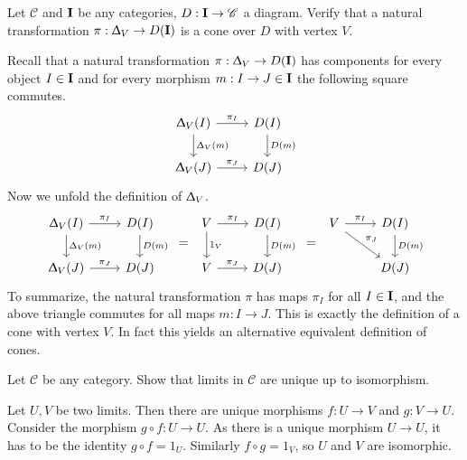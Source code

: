 \begin{exercise}
  Let $\mathscr{C}$ and $\bf{I}$ be any categories, $D : \bf{I} \to \mathscr{C}$ a diagram.
  Verify that a natural transformation $\pi : \Updelta_V \to D(\bf{I})$ is a cone over $D$ with vertex $V$.
\end{exercise}
\begin{answer}
  Recall that a natural transformation $\pi : \Updelta_V \to D(\bf{I})$ has components for every object $I \in \bf{I}$
  and for every morphism $m : I \to J \in \bf{I}$ the following square commutes.
  \[
    \begin{tikzcd}
      \Updelta_V (I) \arrow{r}{\pi_I}  \arrow{d}{\Updelta_V (m)}  & D(I) \arrow{d}{D(m)}    \\
      \Updelta_V (J) \arrow{r}{\pi_J}                & D(J)
    \end{tikzcd}
  \]
  Now we unfold the definition of $\Updelta_V$.
  \[
    \begin{tikzcd}
      \Updelta_V (I) \arrow{r}{\pi_I}  \arrow{d}{\Updelta_V (m)}  & D(I) \arrow{d}{D(m)}    \\
      \Updelta_V (J) \arrow{r}{\pi_J}                & D(J)
    \end{tikzcd}
    \ = \
    \begin{tikzcd}
      V \arrow{r}{\pi_I}  \arrow{d}{1_V}  & D(I) \arrow{d}{D(m)}    \\
      V \arrow{r}{\pi_J}                & D(J)
    \end{tikzcd}
    \ = \
    \begin{tikzcd}
      V \arrow{r}{\pi_I} \arrow{dr}{\pi_J} & D(I) \arrow{d}{D(m)}    \\
                     & D(J)
    \end{tikzcd}
  \]
  To summarize, the natural transformation $\pi$ has maps $\pi_I$ for all $I \in \bf{I}$,
  and the above triangle commutes for all maps $m : I \to J$.
  This is exactly the definition of a cone with vertex $V$.
  In fact this yields an alternative equivalent definition of cones.
\end{answer}

\begin{exercise}
  Let $\mathscr{C}$ be any category. Show that limits in $\mathscr{C}$ are unique up to isomorphism.
\end{exercise}
\begin{answer}
  Let $U, V$ be two limits. Then there are unique morphisms $f : U \to V$ and $g : V \to U$.
  Consider the morphism $g \circ f : U \to U$. As there is a unique morphism $U \to U$, it has to be
  the identity $g \circ f = 1_U$.
  Similarly $f \circ g = 1_V$, so $U$ and $V$ are isomorphic.
\end{answer}

